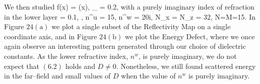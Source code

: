 \vspace{-18mm}
\hspace{-6mm}We then studied
\be
f(x) = \cos(x),
\quad
\varepsilon_{} = 0.2,
\ee
with a purely imaginary index of refraction in the lower layer
\be
\alpha = 0.1,
\quad
{},
\quad
n^u = 15,
\quad
n^w = 20i,
\quad
N_x = N_z = 32,
\quad
N=M=15.
\ee
In Figure $24(\text{a})$ we plot a single subset of the
Reflectivity Map on a single coordinate axis, and in 
Figure $24(\text{b})$ we plot the Energy Defect, where we once again observe an interesting pattern generated through our choice of dielectric constants. As the lower refractive index, $n^w$, is purely imaginary, we do not expect that $(6.2)$ holds and $D\neq 0$. Nonetheless, we still found scattered energy in the far--field and small values of $D$ when the value of $n^w$ is purely imaginary.



